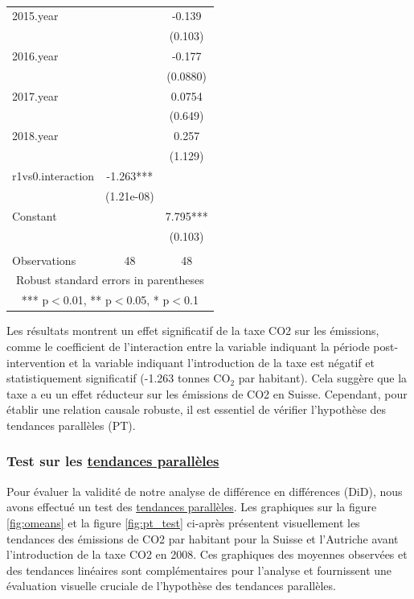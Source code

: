 \begin{table}[ht]
{\begin{tabular}{lcc}
2015.year &  & -0.139 \\
 &  & (0.103) \\
2016.year &  & -0.177 \\
 &  & (0.0880) \\
2017.year &  & 0.0754 \\
 &  & (0.649) \\
2018.year &  & 0.257 \\
 &  & (1.129) \\
r1vs0.interaction & -1.263*** &  \\
 & (1.21e-08) &  \\
Constant &  & 7.795*** \\
 &  & (0.103) \\
 &  &  \\
 Observations & 48 & 48 \\ \hline
\multicolumn{3}{c}{ Robust standard errors in parentheses} \\
\multicolumn{3}{c}{ *** p$<$0.01, ** p$<$0.05, * p$<$0.1} \\
\end{tabular}
}
\caption{}
\label{tab:did_results_table}
\end{table}



Les résultats montrent un effet significatif de la taxe CO2 sur les émissions, comme le coefficient de l'interaction entre la variable indiquant la période post-intervention et la variable indiquant l'introduction de la taxe est négatif et statistiquement significatif (-1.263 tonnes CO$_2$ par habitant). Cela suggère que la taxe a eu un effet réducteur sur les émissions de CO2 en Suisse. Cependant, pour établir une relation causale robuste, il est essentiel de vérifier l'hypothèse des tendances parallèles (PT).


\subsubsection{Test sur les \hyperref[subsec:linear_trend_method]{tendances parallèles}}

\label{subsubsec:pt_test}

Pour évaluer la validité de notre analyse de différence en différences (DiD), nous avons effectué un test des \hyperref[subsec:linear_trend_method]{tendances parallèles}. Les graphiques sur la figure \ref{fig:omeans} et la figure \ref{fig:pt_test} ci-après présentent visuellement les tendances des émissions de CO2 par habitant pour la Suisse et l'Autriche avant l'introduction de la taxe CO2 en 2008. Ces graphiques des moyennes observées et des tendances linéaires sont complémentaires pour l'analyse et fournissent une évaluation visuelle cruciale de l'hypothèse des tendances parallèles.


